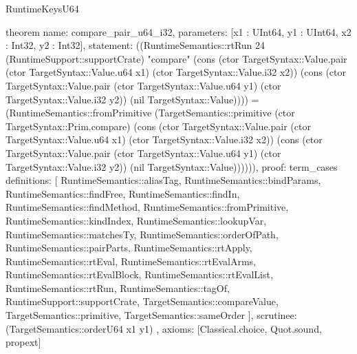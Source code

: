 \begin{lexlean}{RuntimeKeysU64}
\begin{semanticmodule}
theorem{
  name: compare_pair_u64_i32,
  parameters: [x1 : UInt64, y1 : UInt64, x2 : Int32, y2 : Int32],
  statement: ((RuntimeSemantics::rtRun 24 (RuntimeSupport::supportCrate) "compare" (cons (ctor TargetSyntax::Value.pair (ctor TargetSyntax::Value.u64 x1) (ctor TargetSyntax::Value.i32 x2)) (cons (ctor TargetSyntax::Value.pair (ctor TargetSyntax::Value.u64 y1) (ctor TargetSyntax::Value.i32 y2)) (nil TargetSyntax::Value)))) = (RuntimeSemantics::fromPrimitive (TargetSemantics::primitive (ctor TargetSyntax::Prim.compare) (cons (ctor TargetSyntax::Value.pair (ctor TargetSyntax::Value.u64 x1) (ctor TargetSyntax::Value.i32 x2)) (cons (ctor TargetSyntax::Value.pair (ctor TargetSyntax::Value.u64 y1) (ctor TargetSyntax::Value.i32 y2)) (nil TargetSyntax::Value)))))),
  proof: term_cases{
    definitions: [
      RuntimeSemantics::aliasTag,
      RuntimeSemantics::bindParams,
      RuntimeSemantics::findFree,
      RuntimeSemantics::findIn,
      RuntimeSemantics::findMethod,
      RuntimeSemantics::fromPrimitive,
      RuntimeSemantics::kindIndex,
      RuntimeSemantics::lookupVar,
      RuntimeSemantics::matchesTy,
      RuntimeSemantics::orderOfPath,
      RuntimeSemantics::pairParts,
      RuntimeSemantics::rtApply,
      RuntimeSemantics::rtEval,
      RuntimeSemantics::rtEvalArms,
      RuntimeSemantics::rtEvalBlock,
      RuntimeSemantics::rtEvalList,
      RuntimeSemantics::rtRun,
      RuntimeSemantics::tagOf,
      RuntimeSupport::supportCrate,
      TargetSemantics::compareValue,
      TargetSemantics::primitive,
      TargetSemantics::sameOrder
    ],
    scrutinee: (TargetSemantics::orderU64 x1 y1)
  },
  axioms: [Classical.choice, Quot.sound, propext]
}


\end{semanticmodule}
\end{lexlean}

